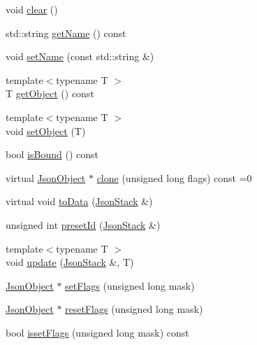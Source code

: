\begin{DoxyCompactItemize}
void \mbox{\hyperlink{classHurricane_1_1JsonObject_a5f11139263926dbd8fe87b9c4480bdae}{clear}} ()
\item 
std\+::string \mbox{\hyperlink{classHurricane_1_1JsonObject_aa4d6d0502f0f25e614ef50ac3dd76263}{get\+Name}} () const
\item 
void \mbox{\hyperlink{classHurricane_1_1JsonObject_aeda98a478720cf29e532e2a11f6f54c5}{set\+Name}} (const std\+::string \&)
\item 
{\footnotesize template$<$typename T $>$ }\\T \mbox{\hyperlink{classHurricane_1_1JsonObject_ab1a1aaaa583d5c8f7adbc9c9d0eeeebf}{get\+Object}} () const
\item 
{\footnotesize template$<$typename T $>$ }\\void \mbox{\hyperlink{classHurricane_1_1JsonObject_aa8e23d2445b90cced19a97d50372314c}{set\+Object}} (T)
\item 
bool \mbox{\hyperlink{classHurricane_1_1JsonObject_a4bb80844dcd175ad16cf92ee29064850}{is\+Bound}} () const
\item 
virtual \mbox{\hyperlink{classHurricane_1_1JsonObject}{Json\+Object}} $\ast$ \mbox{\hyperlink{classHurricane_1_1JsonObject_a939cfbae43f7b0d994648d07bdba2b32}{clone}} (unsigned long flags) const =0
\item 
virtual void \mbox{\hyperlink{classHurricane_1_1JsonObject_a57a845ca64ac8912b35c4dbf75723af6}{to\+Data}} (\mbox{\hyperlink{classHurricane_1_1JsonStack}{Json\+Stack}} \&)
\item 
unsigned int \mbox{\hyperlink{classHurricane_1_1JsonObject_a3819d0c96ee99277e4cc8d349dc4155c}{preset\+Id}} (\mbox{\hyperlink{classHurricane_1_1JsonStack}{Json\+Stack}} \&)
\item 
{\footnotesize template$<$typename T $>$ }\\void \mbox{\hyperlink{classHurricane_1_1JsonObject_ace589494452d9d797506286613642cd4}{update}} (\mbox{\hyperlink{classHurricane_1_1JsonStack}{Json\+Stack}} \&, T)
\item 
\mbox{\hyperlink{classHurricane_1_1JsonObject}{Json\+Object}} $\ast$ \mbox{\hyperlink{classHurricane_1_1JsonObject_a5216e5f5d74f8dbf8665eef8a78b2fe1}{set\+Flags}} (unsigned long mask)
\item 
\mbox{\hyperlink{classHurricane_1_1JsonObject}{Json\+Object}} $\ast$ \mbox{\hyperlink{classHurricane_1_1JsonObject_a8346b1c958574275fe17f9c4cb40ee8b}{reset\+Flags}} (unsigned long mask)
\item 
bool \mbox{\hyperlink{classHurricane_1_1JsonObject_a267c55a1989a9907e25632d820681779}{isset\+Flags}} (unsigned long mask) const
\end{DoxyCompactItemize}


